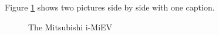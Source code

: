 Figure \ref{fig:mitsubishi_imiev} shows two pictures side by side with one caption.

\begin{figure}[htb]
	\centering
	\hspace{10mm}
	\caption[The Mitsubishi i-MiEV]{The Mitsubishi i-MiEV \cite{mmd2010}}
	\label{fig:mitsubishi_imiev}
\end{figure}